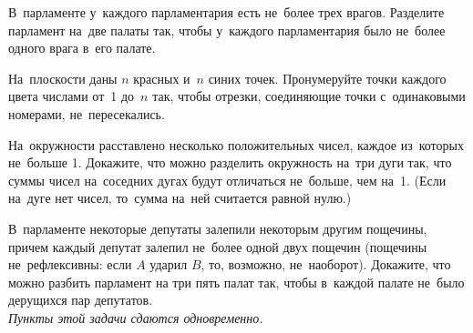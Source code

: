 \begin{problems}

\item
В~парламенте у~каждого парламентария есть не~более трех врагов.
Разделите парламент на~две палаты так, чтобы у~каждого парламентария было
не~более одного врага в~его палате.

\item
На~плоскости даны $n$ красных и~$n$ синих точек.
Пронумеруйте точки каждого цвета числами от~1 до~$n$ так, чтобы отрезки,
соединяющие точки с~одинаковыми номерами, не~пересекались.

\item
На~окружности расставлено несколько положительных чисел, каждое из~которых
не~больше 1.
Докажите, что можно разделить окружность на~три дуги так, что суммы чисел
на~соседних дугах будут отличаться не~больше, чем на~1.
(Если на~дуге нет чисел, то~сумма на~ней считается равной нулю.)

\item
В~парламенте некоторые депутаты залепили некоторым другим пощечины, причем
каждый депутат залепил не~более
\quad
\sp одной
\quad
\sp двух
\quad
пощечин
(пощечины не~рефлексивны: если $A$ ударил $B$, то, возможно, не~наоборот).
\setcounter{jeolmsubproblem}{0}
Докажите, что можно разбить парламент на
\quad
\sp три
\quad
\sp пять
\quad
палат так, чтобы в~каждой палате не~было дерущихся пар депутатов.
\\
\emph{Пункты этой задачи сдаются одновременно.}

\end{problems}

